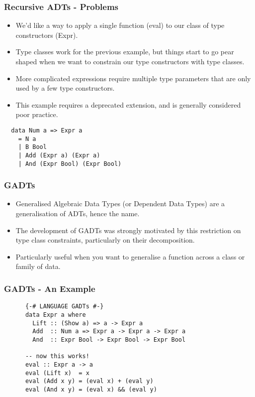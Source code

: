 \documentclass{beamer}
\begin{document}
\begin{frame}[fragile]
\frametitle{Recursive ADTs - Problems}
\begin{itemize}
\item We'd like a way to apply a single function (eval) to our class of type
  constructors (Expr).
\item Type classes work for the previous example, but things start to go pear
  shaped when we want to constrain our type constructors with type classes.
\item More complicated expressions require multiple type parameters that are
  only used by a few type constructors.
\item This example requires a deprecated extension, and is generally
  considered poor practice.
\end{itemize}
\begin{minipage}{1\textwidth}
  \begin{verbatim}
  data Num a => Expr a
    = N a
    | B Bool
    | Add (Expr a) (Expr a)
    | And (Expr Bool) (Expr Bool)
  \end{verbatim}
\end{minipage}
\end{frame}

\begin{frame}[fragile]
\frametitle{GADTs}
  \begin{itemize}
    \item Generalised Algebraic Data Types (or Dependent Data Types) are a
      generalisation of ADTs, hence the name.
    \item The development of GADTs was strongly motivated by this restriction
      on type class constraints, particularly on their decomposition.
    \item Particularly useful when you want to generalise a function across a 
      class or family of data.
  \end{itemize}
  \begin{minipage}{1\textwidth}
  \end{minipage}
\end{frame}

\begin{frame}[fragile]
\frametitle{GADTs - An Example}
  \begin{minipage}{1\textwidth}
    \begin{verbatim}
      {-# LANGUAGE GADTs #-}
      data Expr a where
        Lift :: (Show a) => a -> Expr a
        Add  :: Num a => Expr a -> Expr a -> Expr a
        And  :: Expr Bool -> Expr Bool -> Expr Bool

      -- now this works!
      eval :: Expr a -> a
      eval (Lift x)  = x
      eval (Add x y) = (eval x) + (eval y)
      eval (And x y) = (eval x) && (eval y)
    \end{verbatim}
  \end{minipage}
\end{frame}
\end{document}
